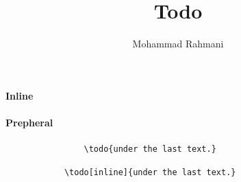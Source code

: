 \documentclass[a4paper]{article}
\title{Todo}
\date{Mohammad Rahmani}
\begin{document}
    \maketitle
    \paragraph{Inline}
    
        \paragraph{Prepheral}
            \begin{verbatim}
                \todo{under the last text.}
            \end{verbatim}
        
        
        \begin{verbatim}
            \todo[inline]{under the last text.}
        \end{verbatim}
    
    
    
\end{document}

